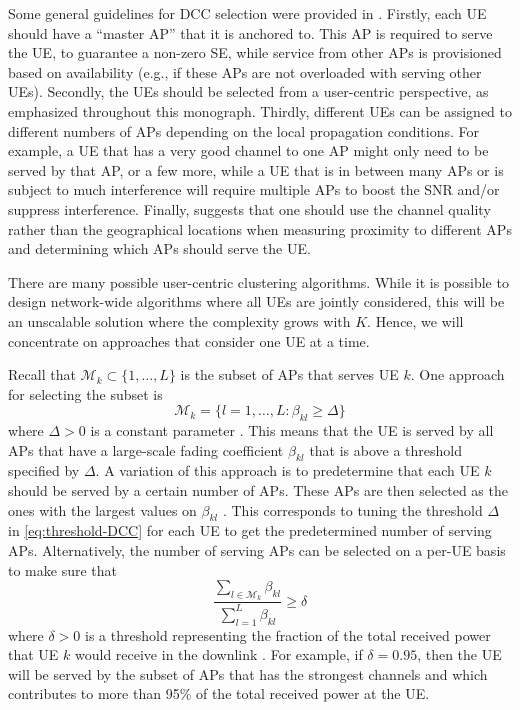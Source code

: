 Some general guidelines for DCC selection  were provided in \cite[Sec.~4.7]{Bjornson2013d}. Firstly, each UE should have a ``master AP'' that it is anchored to. This AP is required to serve the UE, to guarantee a non-zero SE, while service from other APs is provisioned based on availability (e.g., if these APs are not overloaded with serving other UEs). Secondly, the UEs should be selected from a user-centric perspective, as emphasized throughout this monograph.
Thirdly, different UEs can be assigned to different numbers of APs depending on the local propagation conditions. For example, a UE that has a very good channel to one AP might only need to be served by that AP, or a few more, while a UE that is in between many APs or is subject to much interference will require multiple APs to boost the SNR and/or suppress interference.
Finally, \cite{Bjornson2013d} suggests that one should use the channel quality rather than the geographical locations when measuring proximity to different APs and determining which APs should serve the UE.

There are many possible user-centric clustering algorithms. While it is possible to design network-wide algorithms where all UEs are jointly considered, this will be an unscalable solution where the complexity grows with $K$. Hence, we will concentrate on approaches that consider one UE at a time.

Recall that $\mathcal{M}_k \subset \{ 1, \ldots, L \}$ is the subset of APs that serves UE $k$. 
One approach for selecting the subset is
\begin{equation} \label{eq:threshold-DCC}
\mathcal{M}_k = \{ l = 1,\ldots,L : \beta_{kl} \geq \Delta \}
\end{equation}
where $\Delta>0$ is a constant parameter \cite{Bjornson2011a}. This means that the UE is served by all APs that have a large-scale fading coefficient $\beta_{kl} $ that is above a threshold specified by $\Delta$.
A variation of this approach is to predetermine that each UE $k$ should be served by a certain number of APs. These APs are then selected as the ones with the largest values on $\beta_{kl}$ \cite{Buzzi2017a}. This corresponds to tuning the threshold $\Delta$ in \eqref{eq:threshold-DCC} for each UE to get the predetermined number of serving APs.
Alternatively, the number of serving APs can be selected on a per-UE basis to make sure that
\begin{equation}
\frac{\sum_{l \in \mathcal{M}_k } \beta_{kl}}{\sum_{l=1 }^{L} \beta_{kl}} \geq \delta
\end{equation}
where $\delta>0$ is a threshold representing the fraction of the total received power that  UE $k$ would receive in the downlink \cite{Ngo2018a}. For example, if $\delta= 0.95$, then the UE will be served by the subset of APs that has the strongest channels and which contributes to more than 95\% of the total received power at the UE.

